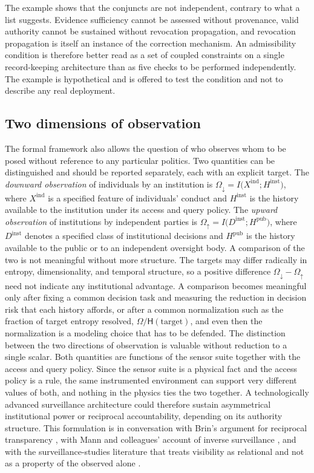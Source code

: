 \documentclass[11pt]{article}
\theoremstyle{plain}
\theoremstyle{definition}
\theoremstyle{remark}
\begin{document}
The example shows that the conjuncts are not independent, contrary to what a list suggests. Evidence sufficiency cannot be assessed without provenance, valid authority cannot be sustained without revocation propagation, and revocation propagation is itself an instance of the correction mechanism. An admissibility condition is therefore better read as a set of coupled constraints on a single record-keeping architecture than as five checks to be performed independently. The example is hypothetical and is offered to test the condition and not to describe any real deployment.

\subsection{Two dimensions of observation}

The formal framework also allows the question of who observes whom to be posed without reference to any particular politics. Two quantities can be distinguished and should be reported separately, each with an explicit target. The \emph{downward observation} of individuals by an institution is $\Omega_{\downarrow}=I\bigl(X^{\mathrm{ind}};H^{\mathrm{inst}}\bigr)$, where $X^{\mathrm{ind}}$ is a specified feature of individuals' conduct and $H^{\mathrm{inst}}$ is the history available to the institution under its access and query policy. The \emph{upward observation} of institutions by independent parties is $\Omega_{\uparrow}=I\bigl(D^{\mathrm{inst}};H^{\mathrm{pub}}\bigr)$, where $D^{\mathrm{inst}}$ denotes a specified class of institutional decisions and $H^{\mathrm{pub}}$ is the history available to the public or to an independent oversight body. A comparison of the two is not meaningful without more structure. The targets may differ radically in entropy, dimensionality, and temporal structure, so a positive difference $\Omega_{\downarrow}-\Omega_{\uparrow}$ need not indicate any institutional advantage. A comparison becomes meaningful only after fixing a common decision task and measuring the reduction in decision risk that each history affords, or after a common normalization such as the fraction of target entropy resolved, $\Omega/\mathsf{H}(\text{target})$, and even then the normalization is a modeling choice that has to be defended. The distinction between the two directions of observation is valuable without reduction to a single scalar. Both quantities are functions of the sensor suite together with the access and query policy. Since the sensor suite is a physical fact and the access policy is a rule, the same instrumented environment can support very different values of both, and nothing in the physics ties the two together. A technologically advanced surveillance architecture could therefore sustain asymmetrical institutional power or reciprocal accountability, depending on its authority structure. This formulation is in conversation with Brin's argument for reciprocal transparency \cite{brin1998}, with Mann and colleagues' account of inverse surveillance \cite{mann2003}, and with the surveillance-studies literature that treats visibility as relational and not as a property of the observed alone \cite{lyon2007}.
\end{document}
